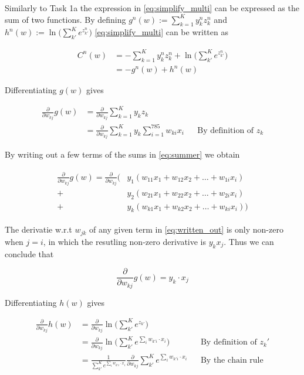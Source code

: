 \documentclass{article}
\begin{document}
Similarly to Task 1a the expression in \eqref{eq:simplify_multi} can be expressed as the sum of two functions. By defining $g^n(w) := \sum_{k=1}^K y_k^n z_k^n$ and $h^n(w) := \ln{\bigg(\sum_{k'}^Ke^{z_{k'}^n}\bigg)}$  \eqref{eq:simplify_multi} can be written as

\begin{align}
    C^n(w) &= -\sum_{k=1}^K y_k^n z_k^n + \ln{\bigg(\sum_{k'}^Ke^{z_{k'}^n}\bigg)} \\
    &= -g^n(w) + h^n(w)
\end{align}

Differentiating $g(w)$ gives

\begin{align}
    \frac{\partial}{\partial w_{kj}} g(w) &= \frac{\partial}{\partial w_{kj}} \sum_{k=1}^K y_k z_k \\
    &= \frac{\partial}{\partial w_{kj}} \sum_{k=1}^K y_k \sum_{i=1}^{785} w_{ki}x_i && \text{By definition of $z_k$} \label{eq:summer}
\end{align}

By writing out a few terms of the sums in \eqref{eq:summer} we obtain

\begin{align}
\begin{split}
    \frac{\partial}{\partial w_{kj}} g(w) = \frac{\partial}{\partial w_{kj}}\Big(&y_1(w_{11}x_1 + w_{12}x_2 + \dots + w_{1i}x_i) \\
    + & y_2(w_{21}x_1 + w_{22}x_2 + \dots + w_{2i}x_i) \\
    + & y_k(w_{k1}x_1 + w_{k2}x_2 + \dots + w_{ki}x_i)  \Big)  
    \label{eq:written_out}
\end{split}
\end{align}


The derivatie w.r.t $w_{jk}$ of any given term in \eqref{eq:written_out} is only non-zero when $j=i$, in which the resutling non-zero derivative is $y_k x_j$. Thus we can conclude that

\begin{equation}
    \frac{\partial}{\partial w_{kj}} g(w) = y_k \cdot x_j\label{eq:gw}
\end{equation}

Differentiating $h(w)$ gives

\begin{align}
    \frac{\partial }{\partial w_{kj}} h(w) &= \frac{\partial }{\partial w_{kj}} \ln{\bigg(\sum_{k'}^Ke^{z_{k'}}\bigg)} \\
    &= \frac{\partial }{\partial w_{kj}} \ln{\bigg(\sum_{k'}^Ke^{\sum_{i} w_{k'i} \cdot x_i}\bigg)} && \text{By definition of $z_k'$} \\
    &= \frac{1}{\sum_{k'}^Ke^{\sum_{i} w_{k'i} \cdot x_i}} \frac{\partial }{\partial w_{kj}} \sum_{k'}^Ke^{\sum_{i} w_{k'i} \cdot x_i} && \text{By the chain rule} \label{eq:part_sum}
\end{align}
\end{document}
